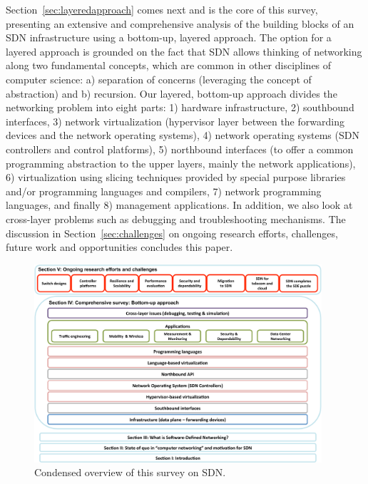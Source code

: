 Section~\ref{sec:layeredapproach} comes next and is the core of this
survey, presenting an extensive and comprehensive
analysis of the building blocks of an SDN infrastructure using a
bottom-up, layered approach.  The option for a layered approach is
grounded on the fact that SDN allows thinking of networking along two
fundamental concepts, which are common in other disciplines of 
computer science: a) separation of concerns (leveraging the concept of abstraction) and b) recursion.
Our layered, bottom-up approach divides the networking problem into eight parts: 1) hardware infrastructure, 2) southbound interfaces, 3) network virtualization (hypervisor layer between 
the forwarding devices and the network operating systems), 4) network operating 
systems (SDN controllers and control platforms), 5) northbound interfaces 
(to offer a common programming abstraction to the upper layers, mainly the network applications), 6) virtualization using slicing techniques provided by special purpose 
libraries and/or programming languages and compilers, 7) network 
programming languages, and finally 8) management applications. In addition, 
we also look at cross-layer problems such as debugging and troubleshooting 
mechanisms. The discussion in Section~\ref{sec:challenges} on ongoing research efforts, challenges, future work and opportunities concludes this paper.


\begin{figure}[t]
\centering
\includegraphics[width=0.95\textwidth]{figures/fig12_survey_condensed_overview.pdf}
\caption{Condensed overview of this survey on SDN.}
\label{fig:conclusion}
\end{figure}

